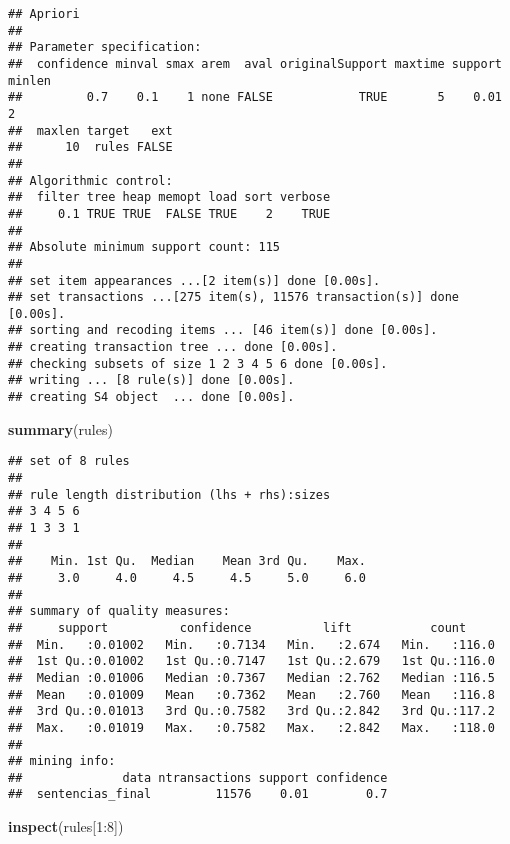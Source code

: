 \documentclass[runningheads,a4paper]{llncs}
\newenvironment{Shaded}{}{}
\newcommand{\KeywordTok}[1]{\textcolor[rgb]{0.00,0.44,0.13}{\textbf{{#1}}}}
\newcommand{\DecValTok}[1]{\textcolor[rgb]{0.25,0.63,0.44}{{#1}}}
\newcommand{\NormalTok}[1]{{#1}}
\newcommand{\OperatorTok}[1]{\textcolor[rgb]{0.40,0.40,0.40}{{#1}}}
\begin{document}
\begin{verbatim}
## Apriori
## 
## Parameter specification:
##  confidence minval smax arem  aval originalSupport maxtime support minlen
##         0.7    0.1    1 none FALSE            TRUE       5    0.01      2
##  maxlen target   ext
##      10  rules FALSE
## 
## Algorithmic control:
##  filter tree heap memopt load sort verbose
##     0.1 TRUE TRUE  FALSE TRUE    2    TRUE
## 
## Absolute minimum support count: 115 
## 
## set item appearances ...[2 item(s)] done [0.00s].
## set transactions ...[275 item(s), 11576 transaction(s)] done [0.00s].
## sorting and recoding items ... [46 item(s)] done [0.00s].
## creating transaction tree ... done [0.00s].
## checking subsets of size 1 2 3 4 5 6 done [0.00s].
## writing ... [8 rule(s)] done [0.00s].
## creating S4 object  ... done [0.00s].
\end{verbatim}

\begin{Shaded}
\begin{Highlighting}[]
\KeywordTok{summary}\NormalTok{(rules)}
\end{Highlighting}
\end{Shaded}

\begin{verbatim}
## set of 8 rules
## 
## rule length distribution (lhs + rhs):sizes
## 3 4 5 6 
## 1 3 3 1 
## 
##    Min. 1st Qu.  Median    Mean 3rd Qu.    Max. 
##     3.0     4.0     4.5     4.5     5.0     6.0 
## 
## summary of quality measures:
##     support          confidence          lift           count      
##  Min.   :0.01002   Min.   :0.7134   Min.   :2.674   Min.   :116.0  
##  1st Qu.:0.01002   1st Qu.:0.7147   1st Qu.:2.679   1st Qu.:116.0  
##  Median :0.01006   Median :0.7367   Median :2.762   Median :116.5  
##  Mean   :0.01009   Mean   :0.7362   Mean   :2.760   Mean   :116.8  
##  3rd Qu.:0.01013   3rd Qu.:0.7582   3rd Qu.:2.842   3rd Qu.:117.2  
##  Max.   :0.01019   Max.   :0.7582   Max.   :2.842   Max.   :118.0  
## 
## mining info:
##              data ntransactions support confidence
##  sentencias_final         11576    0.01        0.7
\end{verbatim}

\begin{Shaded}
\begin{Highlighting}[]
\KeywordTok{inspect}\NormalTok{(rules[}\DecValTok{1}\OperatorTok{:}\DecValTok{8}\NormalTok{])}
\end{Highlighting}
\end{Shaded}
\end{document}
